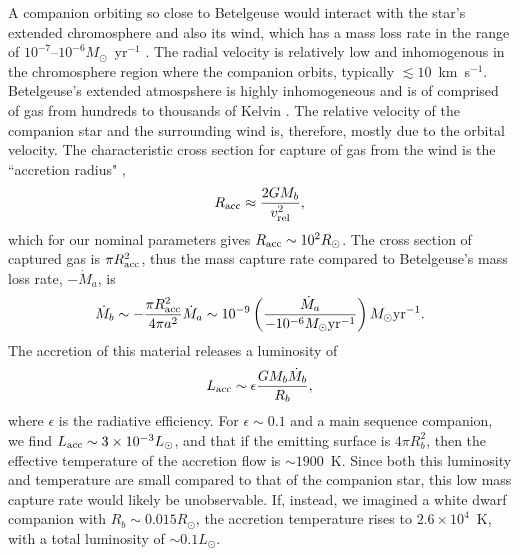\documentclass[twocolumn]{aastex631}
\begin{document}
A companion orbiting so close to Betelgeuse would interact with the star's extended chromosphere \citep{1984ApJ...284..238H,1987ApJ...314..690H,1987ApJ...317L..85D,2000ApJ...545..454L,2001ApJ...551.1073H,2009A&A...504..115K,2011A&A...531A.117K,2020A&A...638A..65O,2024ApJ...966L..13D} and also its wind, which has a mass loss rate in the range of $10^{-7}$--$10^{-6} M_\odot$~yr$^{-1}$ \citep{1986ARA&A..24..377D,1994ApJ...424L.127H,2022AJ....163..103H,2023ApJ...942...69M}. The radial  velocity is relatively low and inhomogenous \citep[e.g.][]{2017A&A...600A.137F} in the chromosphere region where the companion orbits, typically $\lesssim10$~km~s$^{-1}$. Betelgeuse's extended atmospshere is highly inhomogeneous and is of comprised of gas from hundreds to thousands of Kelvin  \citep[e.g.][]{2000ApJ...545..454L,2001ApJ...558..815L,2001ApJ...551.1073H,2017A&A...602L..10O,2020A&A...638A..65O,2022AJ....163..103H,2021A&A...650L..17K,2024ApJ...966L..13D}. The relative velocity of the companion star and the surrounding wind is, therefore, mostly due to the orbital velocity. The characteristic cross section for capture of gas from the wind is the ``accretion radius" \citep{1939PCPS...35..405H}, 
\begin{equation}
    R_{\rm acc} \approx \frac{2GM_b}{v_{\rm rel}^2},
\end{equation}
which for our nominal parameters gives $R_{\rm acc} \sim 10^2 R_\odot$. The cross section of captured gas is $\pi R_{\rm acc}^2$, thus the mass capture rate compared to Betelgeuse's mass loss rate, $-\dot M_a$, is 
\begin{equation}
\dot M_b \sim - \frac{\pi R_{\rm acc}^2 }{4\pi a^2} \dot M_a  \sim 10^{-9} \left(\frac{\dot M_a}{-10^{-6} M_\odot{\rm yr}^{-1}} \right)   M_\odot{\rm yr}^{-1}.
\end{equation}
The accretion of this material releases a luminosity of 
\begin{equation}
    L_{\rm acc} \sim \epsilon \frac{G M_b \dot M_b}{R_b},
\end{equation}
where $\epsilon$ is the radiative efficiency. For $\epsilon\sim0.1$ and a main sequence companion, we find $L_{\rm acc}\sim 3\times 10^{-3} L_\odot$, and that if the emitting surface is $4\pi R_b^2$, then the effective temperature of the accretion flow is $\sim 1900$~K. Since both this luminosity and temperature are small compared to that of the companion star, this low mass capture rate would likely be unobservable. If, instead, we imagined a white dwarf companion with $R_b\sim 0.015R_\odot$, the accretion temperature rises to $2.6\times 10^4$~K, with a total luminosity of $\sim 0.1L_\odot$. 
\end{document}
